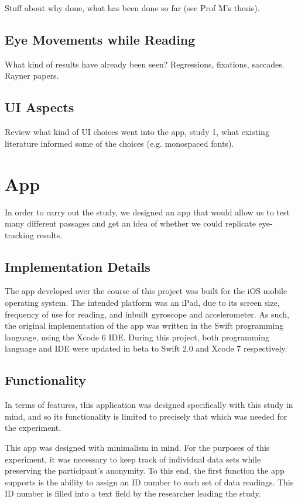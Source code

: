 \documentclass[11pt,letterpaper]{article}
\begin{document}
Stuff about why done, what has been done so far (see Prof M's thesis).

\subsection{Eye Movements while Reading}

What kind of results have already been seen? Regressions, fixations, saccades. Rayner papers.

\subsection{UI Aspects}

Review what kind of UI choices went into the app, study 1, what existing literature informed some of the choices (e.g. monospaced fonts).

\section{App}
\label{sec:app}

In order to carry out the study, we designed an app that would allow us to test many different passages and get an idea of whether we could replicate eye-tracking results.

\subsection{Implementation Details}

The app developed over the course of this project was built for the iOS mobile operating system. The intended platform was an iPad, due to its screen size, frequency of use for reading, and inbuilt gyroscope and accelerometer. As such, the original implementation of the app was written in the Swift programming language, using the Xcode 6 IDE. During this project, both programming language and IDE were updated in beta to Swift 2.0 and Xcode 7 respectively.

\subsection{Functionality}

In terms of features, this application was designed specifically with this study in mind, and so its functionality is limited to precisely that which was needed for the experiment.

This app was designed with minimalism in mind. For the purposes of this experiment, it was necessary to keep track of individual data sets while preserving the participant's anonymity. To this end, the first function the app supports is the ability to assign an ID number to each set of data readings. This ID number is filled into a text field by the researcher leading the study.
\end{document}
